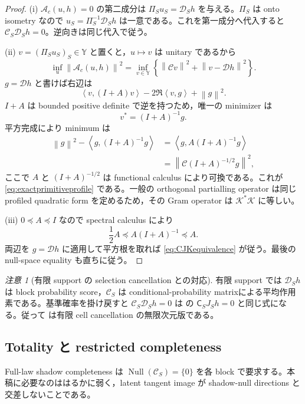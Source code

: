 \documentclass[11pt,a4paper]{ltjsarticle}
\theoremstyle{remark}
\newtheorem{remark}{注意}[section]
\newcommand{\norm}[1]{\left\lVert#1\right\rVert}
\newcommand{\inner}[2]{\left\langle#1,#2\right\rangle}
\newcommand{\Aop}{\mathscr A}
\newcommand{\Cop}{\mathscr C}
\newcommand{\Jcal}{\mathscr D}
\newcommand{\Kop}{\mathscr K}
\newcommand{\Null}{\operatorname{Null}}
\begin{document}
\begin{proof}
(i) $\Aop_c(u,h)=0$ の第二成分は $\Pi_Su_S=\Jcal_Sh$ を与える。$\Pi_S$ は onto isometry なので $u_S=\Pi_S^{-1}\Jcal_Sh$ は一意である。これを第一成分へ代入すると $\Cop_S\Jcal_Sh=0$。逆向きは同じ代入で従う。

(ii) $v=(\Pi_Su_S)_S\in\mathbb Y$ と置くと，$u\mapsto v$ は unitary であるから
\begin{equation}
\inf_u\norm{\Aop_c(u,h)}^2
=
\inf_{v\in\mathbb Y}
\left\{\norm{\Cop v}^2+\norm{v-\Jcal h}^2\right\}.
\label{eq:profilev}
\end{equation}
$g=\Jcal h$ と書けば右辺は
\[
\inner v{(I+A)v}-2\Re\inner vg+\norm g^2.
\]
$I+A$ は bounded positive definite で逆を持つため，唯一の minimizer は
\[
v^*=(I+A)^{-1}g.
\]
平方完成により minimum は
\begin{align*}
\norm g^2-\inner g{(I+A)^{-1}g}
&=\inner g{A(I+A)^{-1}g}\\
&=\norm{\Cop(I+A)^{-1/2}g}^2,
\end{align*}
ここで $A$ と $(I+A)^{-1/2}$ は functional calculus により可換である。これが \eqref{eq:exactprimitiveprofile} である。一般の orthogonal partialling operator は同じ profiled quadratic form を定めるため，その Gram operator は $\Kop^*\Kop$ に等しい。

(iii) $0\preceq A\preceq I$ なので spectral calculus により
\[
\frac12A\preceq A(I+A)^{-1}\preceq A.
\]
両辺を $g=\Jcal h$ に適用して平方根を取れば \eqref{eq:CJKequivalence} が従う。最後の null-space equality も直ちに従う。
\end{proof}

\begin{remark}[有限 support の selection cancellation との対応]\label{rem:continuousfinitecorrespondence}
有限 support では $\Jcal_Sh$ は block probability score，$\Cop_S$ は conditional-probability matrixによる平均作用素である。基準確率を掛け戻すと $\Cop_S\Jcal_Sh=0$ は  の $\mathsf C_SJ_Sh=0$ と同じ式になる。従って  は有限 cell cancellation の無限次元版である。
\end{remark}

\subsection{Totality と restricted completeness}

Full-law shadow completeness は $\Null(\Cop_S)=\{0\}$ を各 block で要求する。本稿に必要なのははるかに弱く，latent tangent image が shadow-null directions と交差しないことである。
\end{document}
